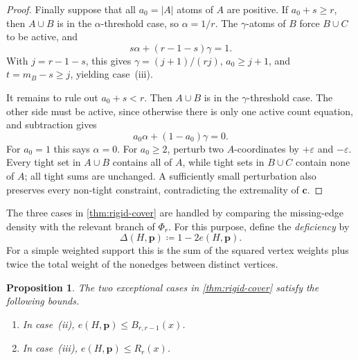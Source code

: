 \documentclass[10pt]{article}
\numberwithin{equation}{section}
\newtheorem{proposition}[proposition]{Proposition}
\newcommand{\vct}[1]{\boldsymbol{#1}}
\begin{document}
\begin{proof}
Finally suppose that all $a_0=|A|$ atoms of $A$ are positive.  If $a_0+s\ge r$, then $A\cup B$ is in the $\alpha$-threshold case, so $\alpha=1/r$.  The $\gamma$-atoms of $B$ force $B\cup C$ to be active, and
\[
 s\alpha+(r-1-s)\gamma=1.
\]
With $j=r-1-s$, this gives $\gamma=(j+1)/(rj)$, $a_0\ge j+1$, and $t=m_B-s\ge j$, yielding case~\textup{(iii)}.

It remains to rule out $a_0+s<r$.  Then $A\cup B$ is in the $\gamma$-threshold case.  The other side must be active, since otherwise there is only one active count equation, and subtraction gives
\[
 a_0\alpha+(1-a_0)\gamma=0.
\]
For $a_0=1$ this says $\alpha=0$.  For $a_0\ge2$, perturb two $A$-coordinates by $+\varepsilon$ and $-\varepsilon$.  Every tight set in $A\cup B$ contains all of $A$, while tight sets in $B\cup C$ contain none of $A$; all tight sums are unchanged.  A sufficiently small perturbation also preserves every non-tight constraint, contradicting the extremality of $\vct c$.
\end{proof}

The three cases in \cref{thm:rigid-cover} are handled by comparing the missing-edge density with the relevant branch of $\Phi_r$.  For this purpose, define the \emph{deficiency} by
\begin{equation}\label{eq:weighted-deficiency}
 \Delta(H,\vct p)\coloneqq1-2e(H,\vct p).
\end{equation}
For a simple weighted support this is the sum of the squared vertex weights plus twice the total weight of the nonedges between distinct vertices.

\begin{proposition}\label{prop:rigid-case-bounds}
The two exceptional cases in \cref{thm:rigid-cover} satisfy the following bounds.
\begin{enumerate}[label=\textup{(\roman*)}]
\item In case~\textup{(ii)}, $e(H,\vct p)\le B_{r,r-1}(x)$.
\item In case~\textup{(iii)}, $e(H,\vct p)\le R_r(x)$.
\end{enumerate}
\end{proposition}
\end{document}
